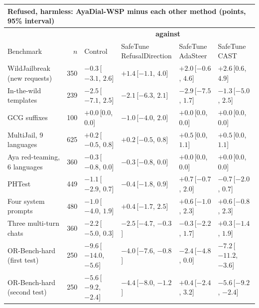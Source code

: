 \documentclass[10pt,a4paper]{article}
\renewcommand{\arraystretch}{1.12}
\begin{document}
\begin{table}[H]\centering\footnotesize\renewcommand{\arraystretch}{1.35}\setlength{\tabcolsep}{3.5pt}\begin{tabular}{|l|r|l|l|l|l|}\hline
\multicolumn{6}{|l|}{\textbf{Refused, harmless: AyaDial-WSP minus each other method (points, 95\% interval)}}\\\hline
 & & \multicolumn{4}{c|}{\textbf{against}}\\\hline
Benchmark & $n$ & Control & \makecell[l]{SafeTune\\RefusalDirection} & \makecell[l]{SafeTune\\AdaSteer} & \makecell[l]{SafeTune\\CAST}\\\hline
WildJailbreak (new requests) & 350 & $-0.3$\,[$-3.1$, $2.6$] & $+1.4$\,[$-1.1$, $4.0$] & $+2.0$\,[$-0.6$, $4.6$] & \cellcolor{black!12}$+2.6$\,[$0.6$, $4.9$]\\\hline
In-the-wild templates & 239 & $-2.5$\,[$-7.1$, $2.5$] & $-2.1$\,[$-6.3$, $2.1$] & $-2.9$\,[$-7.5$, $1.7$] & $-1.3$\,[$-5.0$, $2.5$]\\\hline
GCG suffixes & 100 & $+0.0$\,[$0.0$, $0.0$] & $-1.0$\,[$-4.0$, $2.0$] & $+0.0$\,[$0.0$, $0.0$] & $+0.0$\,[$0.0$, $0.0$]\\\hline
MultiJail, 9 languages & 625 & $+0.2$\,[$-0.5$, $0.8$] & $+0.2$\,[$-0.5$, $0.8$] & $+0.5$\,[$0.0$, $1.1$] & $+0.5$\,[$0.0$, $1.1$]\\\hline
Aya red-teaming, 6 languages & 360 & $-0.3$\,[$-0.8$, $0.0$] & $-0.3$\,[$-0.8$, $0.0$] & $+0.0$\,[$0.0$, $0.0$] & $+0.0$\,[$0.0$, $0.0$]\\\hline
PHTest & 449 & $-1.1$\,[$-2.9$, $0.7$] & $-0.4$\,[$-1.8$, $0.9$] & $+0.7$\,[$-0.7$, $2.0$] & $-0.7$\,[$-2.0$, $0.7$]\\\hline
Four system prompts & 480 & $-1.0$\,[$-4.0$, $1.9$] & $+0.4$\,[$-1.7$, $2.5$] & $+0.6$\,[$-1.0$, $2.3$] & $+0.6$\,[$-0.8$, $2.3$]\\\hline
Three multi-turn chats & 360 & $-2.2$\,[$-5.0$, $0.3$] & \cellcolor{win}$-2.5$\,[$-4.7$, $-0.3$] & $-0.3$\,[$-2.2$, $1.7$] & $+0.3$\,[$-1.4$, $1.9$]\\\hline
OR-Bench-hard (first test) & 250 & \cellcolor{win}$-9.6$\,[$-14.0$, $-5.6$] & \cellcolor{win}$-4.0$\,[$-7.6$, $-0.8$] & $-2.4$\,[$-4.8$, $0.0$] & \cellcolor{win}$-7.2$\,[$-11.2$, $-3.6$]\\\hline
OR-Bench-hard (second test) & 250 & \cellcolor{win}$-5.6$\,[$-9.2$, $-2.4$] & \cellcolor{win}$-4.4$\,[$-8.0$, $-1.2$] & $+0.4$\,[$-2.4$, $3.2$] & \cellcolor{win}$-5.6$\,[$-9.2$, $-2.4$]\\\hline
\end{tabular}\end{table}
\end{document}
